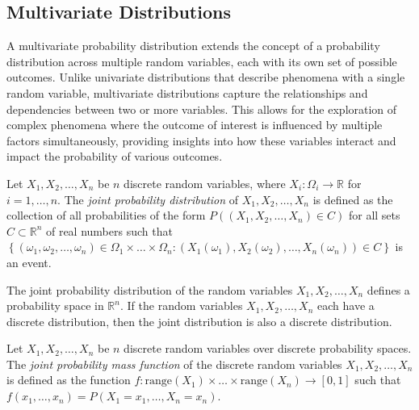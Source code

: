 
\subsection{Multivariate Distributions}

A multivariate probability distribution extends the concept of a probability distribution across multiple random variables, each with its own set of possible outcomes. Unlike univariate distributions that describe phenomena with a single random variable, multivariate distributions capture the relationships and dependencies between two or more variables. This allows for the exploration of complex phenomena where the outcome of interest is influenced by multiple factors simultaneously, providing insights into how these variables interact and impact the probability of various outcomes.

\begin{definition}
Let $X_1, X_2, \ldots, X_n$ be $n$ discrete random variables, where $X_i : \Omega_i \rightarrow \mathbb{R}$ for $i=1, \ldots, n$. The \emph{joint probability distribution} of $X_1, X_2, \ldots, X_n$ is defined as the collection of all probabilities of the form $P\left( \left( X_1, X_2, \ldots, X_n \right) \in C \right)$ for all sets $C \subset \mathbb{R}^n$ of real numbers such that $\left\{ \left( \omega_1, \omega_2, \ldots, \omega_n \right) \in \Omega_1 \times \ldots \times \Omega_n : \left( X_1 \left( \omega_1 \right), X_2 \left( \omega_2 \right), \ldots, X_n \left( \omega_n \right) \right) \in C \right\}$ is an event.
\end{definition}

The joint probability distribution of the random variables $X_1, X_2, \ldots, X_n$ defines a probability space in $\mathbb{R}^n$. If the random variables $X_1, X_2, \ldots, X_n$ each have a discrete distribution, then the joint distribution is also a discrete distribution.

\begin{definition}
Let $X_1, X_2, \ldots, X_n$ be $n$ discrete random variables over discrete probability spaces. The \emph{joint probability mass function} of the discrete random variables $X_1, X_2, \ldots, X_n$ is defined as the function $f : \text{range} \left( X_1 \right) \times \ldots \times \text{range} \left( X_n \right) \rightarrow [0, 1]$ such that $f \left( x_1, \ldots, x_n \right) = P \left( X_1 = x_1, \ldots, X_n = x_n \right)$.
\end{definition}

